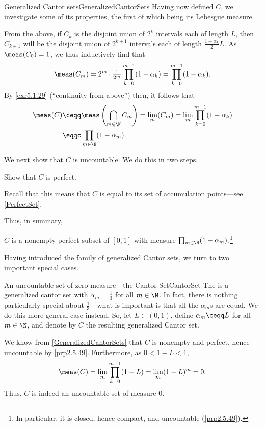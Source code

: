 \begin{exm}{Generalized Cantor sets}{GeneralizedCantorSets}
Having now defined $C$, we investigate some of its properties, the first of which being its Lebesgue measure.

From the above, if $C_k$ is the disjoint union of $2^k$ intervals each of length $L$, then $C_{k+1}$ will be the disjoint union of $2^{k+1}$ intervals each of length $\frac{1-\alpha _k}{2}L$.  As $\meas (C_0)=1$, we thus inductively find that
\begin{equation}
\meas (C_m)=2^m\cdot \tfrac{1}{2^m}\prod _{k=0}^{m-1}(1-\alpha _k)=\prod _{k=0}^{m-1}(1-\alpha _k).
\end{equation}
By \cref{exr5.1.29} (``continuity from above'') then, it follows that
\begin{equation}
\begin{split}
\meas (C) & \ceqq \meas \left( \bigcap _{m\in \N}C_m\right) =\lim _m(C_m)=\lim _m\prod _{k=0}^{m-1}(1-\alpha _k)\\
& \eqqc \prod _{m\in \N}(1-\alpha _m).
\end{split}
\end{equation}

We next show that $C$ is uncountable.  We do this in two steps.
\begin{exr}[breakable=false]{}{}
Show that $C$ is perfect.
\begin{rmk}
Recall that this means that $C$ is equal to its set of accumulation points---see \cref{PerfectSet}.
\end{rmk}
\end{exr}

Thus, in summary,
\begin{important}
$C$ is a nonempty perfect subset of $[0,1]$ with measure $\prod _{m\in \N}(1-\alpha _m)$.\footnote{In particular, it is closed, hence compact, and uncountable (\cref{prp2.5.49}).}
\end{important}
\end{exm}
Having introduced the family of generalized Cantor sets, we turn to two important special cases.
\begin{exm}{An uncountable set of zero measure---the Cantor Set}{CantorSet}
The  is a generalized cantor set with $\alpha _m=\frac{1}{3}$ for all $m\in \N$.  In fact, there is nothing particularly special about $\frac{1}{3}$---what is important is that all the $\alpha _m$s are equal.  We do this more general case instead.  So, let $L\in (0,1)$, define $\alpha _m\ceqq L$ for all $m\in \N$, and denote by $C$ the resulting generalized Cantor set.

We know from \cref{GeneralizedCantorSets} that $C$ is nonempty and perfect, hence uncountable by \cref{prp2.5.49}.  Furthermore, as $0<1-L<1$,
\begin{equation}
\meas (C)=\lim _m\prod _{k=0}^{m-1}(1-L)=\lim _m(1-L)^m=0.
\end{equation} 
Thus, $C$ is indeed an uncountable set of measure $0$.
\end{exm}
